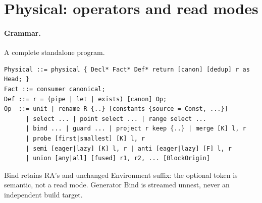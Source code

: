 \section{Physical: operators and read modes}
\label{sec:physical}

\paragraph{Grammar.} A complete standalone program.
\begin{lstlisting}
Physical ::= physical { Decl* Fact* Def* return [canon] [dedup] r as Head; }
Fact ::= consumer canonical;
Def ::= r = (pipe | let | exists) [canon] Op;
Op  ::= unit | rename R {..} [constants {source = Const, ...}]
      | select ... | point select ... | range select ...
      | bind ... | guard ... | project r keep {..} | merge [K] l, r
      | probe [first|smallest] [K] l, r
      | semi [eager|lazy] [K] l, r | anti [eager|lazy] [F] l, r
      | union [any|all] [fused] r1, r2, ... [BlockOrigin]
\end{lstlisting}
Bind retains RA's 
and unchanged Environment suffix: the optional token is semantic, not a read
mode. Generator Bind is streamed unnest, never an independent build target.

